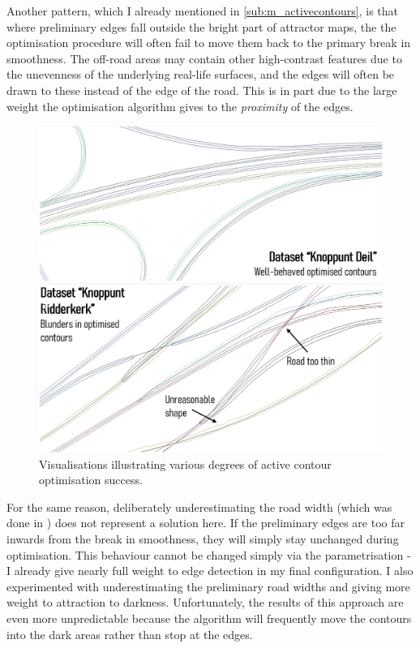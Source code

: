 Another pattern, which I already mentioned in \ref{sub:m_activecontours}, is that where preliminary edges fall outside the bright part of attractor maps, the the optimisation procedure will often fail to move them back to the primary break in smoothness. The off-road areas may contain other high-contrast features due to the unevenness of the underlying real-life surfaces, and the edges will often be drawn to these instead of the edge of the road. This is in part due to the large weight the optimisation algorithm gives to the \textit{proximity} of the edges.

\begin{figure}
    \centering
    \includegraphics[width=0.85\linewidth]{final_report/figs/activecontouroptimisation0.png}
    \caption{Visualisations illustrating various degrees of active contour optimisation success.}
    \label{fig:activecontouroptimisation0}
\end{figure}

For the same reason, deliberately underestimating the road width (which was done in \cite{boyko_funkhauser_2011}) does not represent a solution here. If the preliminary edges are too far inwards from the break in smoothness, they will simply stay unchanged during optimisation. This behaviour cannot be changed simply via the parametrisation - I already give nearly full weight to edge detection in my final configuration. I also experimented with underestimating the preliminary road widths and giving more weight to attraction to darkness. Unfortunately, the results of this approach are even more unpredictable because the algorithm will frequently move the contours into the dark areas rather than stop at the edges.

